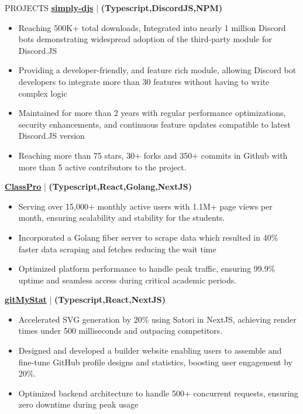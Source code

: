 \documentclass{resume} %
\begin{document}


\begin{rSection}{PROJECTS}    
    \textbf{\href{https://github.com/Rahuletto/simply-djs}{simply-djs}} | \textbf{(Typescript,DiscordJS,NPM)}
\begin{itemize}
\itemsep -3pt{}
\item Reaching 500K+ total downloads, Integrated into nearly 1 million Discord bots demonstrating widespread adoption of the third-party module for Discord.JS
\item Providing a developer-friendly, and feature rich module, allowing Discord bot developers to integrate more than 30 features without having to write complex logic
\item Maintained for more than 2 years with regular performance optimizations, security enhancements, and continuous feature updates compatible to latest Discord.JS version
\item Reaching more than 75 stars, 30+ forks and 350+ commits in Github with more than 5 active contributors to the project.
\end{itemize}
\textbf{\href{https://github.com/Rahuletto/ClassPro}{ClassPro}} | \textbf{(Typescript,React,Golang,NextJS)}
\begin{itemize}
\itemsep -3pt{}
\item Serving over 15,000+ monthly active users with 1.1M+ page views per month, ensuring scalability and stability for the students.
\item Incorporated a Golang fiber server to scrape data which resulted in 40\% faster data scraping and fetches reducing the wait time
\item Optimized platform performance to handle peak traffic, ensuring 99.9\% uptime and seamless access during critical academic periods.
\end{itemize}
\textbf{\href{https://github.com/Rahuletto/gitMyStat}{gitMyStat}} | \textbf{(Typescript,React,NextJS)}
\begin{itemize}
\itemsep -3pt{}
\item Accelerated SVG generation by 20\% using Satori in NextJS, achieving render times under 500 milliseconds and outpacing competitors.
\item Designed and developed a builder website enabling users to assemble and fine-tune GitHub profile designs and statistics, boosting user engagement by 20\%.
\item Optimized backend architecture to handle 500+ concurrent requests, ensuring zero downtime during peak usage
\end{itemize}
\end{rSection}
\end{document}

